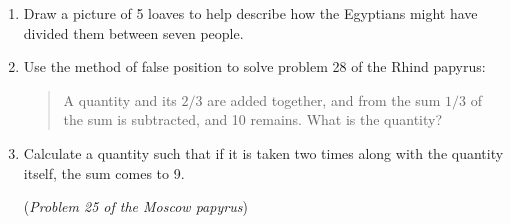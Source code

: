 \begin{exercises*}{}{}
\begin{enumerate}
	  \item Draw a picture of 5 loaves to help describe how the Egyptians might have divided them between seven people.
	  
	  \item%
	  Use the method of false position to solve problem 28 of the Rhind papyrus:
	  \begin{quote}
	  	A quantity and its $2/3$ are added together, and from the sum $1/3$ of the sum is subtracted, and 10 remains. What is the quantity?
	  \end{quote}
	  
	  \item %
	  Calculate a quantity such that if it is taken two times along with the quantity itself, the sum comes to 9.\par
	  (\emph{Problem 25 of the Moscow papyrus})
	\end{enumerate}
\end{exercises*}

